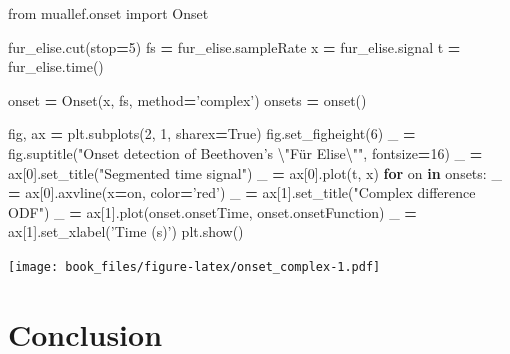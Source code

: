 \documentclass[american,]{article}
\newenvironment{Shaded}{\begin{snugshade}}{\end{snugshade}}
\newcommand{\CharTok}[1]{\textcolor[rgb]{0.31,0.60,0.02}{#1}}
\newcommand{\ControlFlowTok}[1]{\textcolor[rgb]{0.13,0.29,0.53}{\textbf{#1}}}
\newcommand{\DecValTok}[1]{\textcolor[rgb]{0.00,0.00,0.81}{#1}}
\newcommand{\ImportTok}[1]{#1}
\newcommand{\KeywordTok}[1]{\textcolor[rgb]{0.13,0.29,0.53}{\textbf{#1}}}
\newcommand{\NormalTok}[1]{#1}
\newcommand{\OperatorTok}[1]{\textcolor[rgb]{0.81,0.36,0.00}{\textbf{#1}}}
\newcommand{\StringTok}[1]{\textcolor[rgb]{0.31,0.60,0.02}{#1}}
\newcommand{\VariableTok}[1]{\textcolor[rgb]{0.00,0.00,0.00}{#1}}
\begin{document}
\begin{Shaded}
\begin{Highlighting}[]
\ImportTok{from}\NormalTok{ muallef.onset }\ImportTok{import}\NormalTok{ Onset}

\NormalTok{fur_elise.cut(stop}\OperatorTok{=}\DecValTok{5}\NormalTok{)}
\NormalTok{fs }\OperatorTok{=}\NormalTok{ fur_elise.sampleRate}
\NormalTok{x }\OperatorTok{=}\NormalTok{ fur_elise.signal}
\NormalTok{t }\OperatorTok{=}\NormalTok{ fur_elise.time()}

\NormalTok{onset }\OperatorTok{=}\NormalTok{ Onset(x, fs, method}\OperatorTok{=}\StringTok{'complex'}\NormalTok{)}
\NormalTok{onsets }\OperatorTok{=}\NormalTok{ onset()}

\NormalTok{fig, ax }\OperatorTok{=}\NormalTok{ plt.subplots(}\DecValTok{2}\NormalTok{, }\DecValTok{1}\NormalTok{, sharex}\OperatorTok{=}\VariableTok{True}\NormalTok{)}
\NormalTok{fig.set_figheight(}\DecValTok{6}\NormalTok{)}
\NormalTok{_ }\OperatorTok{=}\NormalTok{ fig.suptitle(}\StringTok{"Onset detection of Beethoven's }\CharTok{\textbackslash{}"}\StringTok{Für Elise}\CharTok{\textbackslash{}"}\StringTok{"}\NormalTok{, fontsize}\OperatorTok{=}\DecValTok{16}\NormalTok{)}
\NormalTok{_ }\OperatorTok{=}\NormalTok{ ax[}\DecValTok{0}\NormalTok{].set_title(}\StringTok{"Segmented time signal"}\NormalTok{)}
\NormalTok{_ }\OperatorTok{=}\NormalTok{ ax[}\DecValTok{0}\NormalTok{].plot(t, x)}
\ControlFlowTok{for}\NormalTok{ on }\KeywordTok{in}\NormalTok{ onsets:}
\NormalTok{    _ }\OperatorTok{=}\NormalTok{ ax[}\DecValTok{0}\NormalTok{].axvline(x}\OperatorTok{=}\NormalTok{on, color}\OperatorTok{=}\StringTok{'red'}\NormalTok{)}
\NormalTok{_ }\OperatorTok{=}\NormalTok{ ax[}\DecValTok{1}\NormalTok{].set_title(}\StringTok{"Complex difference ODF"}\NormalTok{)}
\NormalTok{_ }\OperatorTok{=}\NormalTok{ ax[}\DecValTok{1}\NormalTok{].plot(onset.onsetTime, onset.onsetFunction)}
\NormalTok{_ }\OperatorTok{=}\NormalTok{ ax[}\DecValTok{1}\NormalTok{].set_xlabel(}\StringTok{'Time (s)'}\NormalTok{)}
\NormalTok{plt.show()}
\end{Highlighting}
\end{Shaded}

\texttt{[image: book\_files/figure-latex/onset\_complex-1.pdf]}

\pagebreak

\hypertarget{conclusion}{%
\section{Conclusion}\label{conclusion}}
\end{document}
